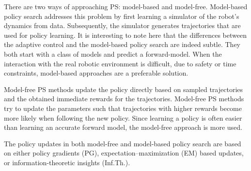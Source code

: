 There are two ways of approaching PS: model-based and model-free. Model-based policy search addresses this problem by first learning a simulator of the robot’s dynamics from data. Subsequently, the simulator generates trajectories that are used for policy learning. It is interesting to note here that the differences between the adaptive control and the model-based policy search are indeed subtle. They both start with a class of models and predict a forward-model. When the interaction with the real robotic environment is difficult, due to safety or time constraints, model-based approaches are a preferable solution.

Model-free PS methods update the policy directly based on sampled trajectories and the obtained immediate rewards for the trajectories. Model-free PS methods try to update the parameters such that trajectories with higher rewards become more likely when following the new policy. Since learning a policy is often easier than learning an accurate forward model, the model-free approach is more used. 

The policy updates in both model-free and model-based policy search are based on either policy gradients (PG), expectation–maximization (EM) based updates, or information-theoretic insights (Inf.Th.). 

